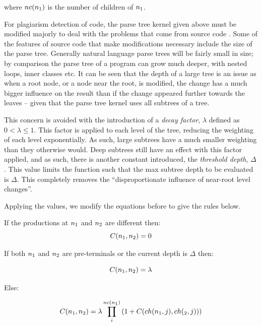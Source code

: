 where $nc(n\textsubscript{1})$ is the number of children of $n\textsubscript{1}$.

For plagiarism detection of code, the parse tree kernel given above must be
modified majorly to deal with the problems that come from source code
\cite{ParseTreeKernel}. Some of the features of source code that make modifications
necessary include the size of the parse tree. Generally natural language parse
trees will be fairly small in size; by comparison the parse tree of a program can
grow much deeper, with nested loops, inner classes etc. It can be seen that the
depth of a large tree is an issue as when a root node, or a node near the root,
is modified, the change has a much bigger influence on the result than if
the change appeared further towards the leaves -- given that the parse tree 
kernel uses all subtrees of a tree\cite{ParseTreeKernel}. 

This concern is avoided with the introduction of a \emph{decay factor},
$\lambda$ defined as $0 < \lambda \le 1$. This factor is applied to each
level of the tree, reducing the weighting of each level exponentially.
As such, large subtrees have a much smaller weighting than they otherwise
would\cite{ParseTreeKernel}. Deep subtrees still have an effect with this factor
applied, and as such, there is another constant introduced, the \emph{threshold
depth}, $\Delta$. This value limits the function such that the max subtree depth
to be evaluated is $\Delta$. This completely removes the ``disproportionate influence
of near-root level changes''\cite{ParseTreeKernel}.

Applying the values, we modify the equations before to give the rules below.

If the productions at $n\textsubscript{1}$ and $n\textsubscript{2}$ are different
then:
\begin{equation}
C(n\textsubscript{1}, n\textsubscript{2}) = 0
\end{equation}

If both $n\textsubscript{1}$ and $n\textsubscript{2}$ are pre-terminals or the
current depth is $\Delta$ then:

\begin{equation}
C(n\textsubscript{1}, n\textsubscript{2}) = \lambda
\end{equation}

Else:

\begin{equation}
C(n\textsubscript{1}, n\textsubscript{2}) = \lambda\prod_{i}^{nc(n\textsubscript{1})}
{(1+C(ch(n\textsubscript{1}, j), ch(\textsubscript{2}, j)))}
\end{equation}
\cite{ParseTreeKernel}

